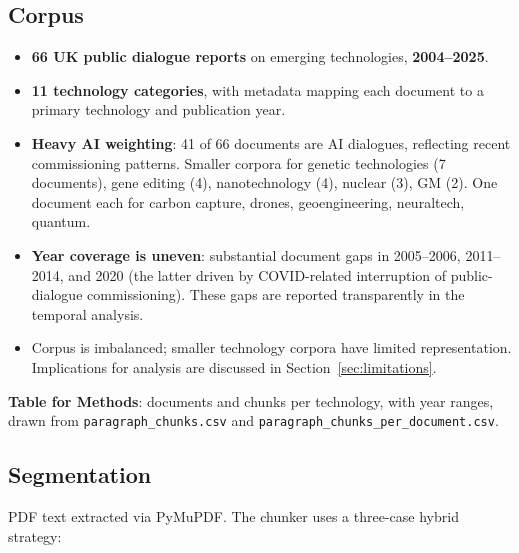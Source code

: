 \documentclass[11pt, a4paper]{article}
\begin{document}
\subsection{Corpus}

\begin{itemize}
\item \textbf{66 UK public dialogue reports} on emerging technologies,
      \textbf{2004--2025}.
\item \textbf{11 technology categories}, with metadata mapping each
      document to a primary technology and publication year.
\item \textbf{Heavy AI weighting}: 41 of 66 documents are AI dialogues,
      reflecting recent commissioning patterns.  Smaller corpora for
      genetic technologies (7 documents), gene editing (4), nanotechnology
      (4), nuclear (3), GM (2).  One document each for carbon capture,
      drones, geoengineering, neuraltech, quantum.
\item \textbf{Year coverage is uneven}: substantial document gaps in
      2005--2006, 2011--2014, and 2020 (the latter driven by
      COVID-related interruption of public-dialogue commissioning).
      These gaps are reported transparently in the temporal analysis.
\item Corpus is imbalanced; smaller technology corpora have limited
      representation.  Implications for analysis are discussed in
      Section~\ref{sec:limitations}.
\end{itemize}

\noindent\textbf{Table for Methods}: documents and chunks per technology,
with year ranges, drawn from \texttt{paragraph\_chunks.csv} and
\texttt{paragraph\_chunks\_per\_document.csv}.

\subsection{Segmentation}

PDF text extracted via PyMuPDF\@.  The chunker uses a three-case hybrid
strategy:
\end{document}
